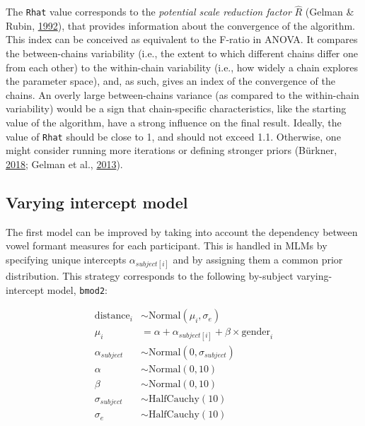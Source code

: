 \documentclass[a4paper,12pt,twoside,openright,oldfontcommands,final]{memoir}
\begin{document}
The \texttt{Rhat} value corresponds to the \emph{potential scale reduction factor} \(\hat{R}\) (Gelman \& Rubin, \protect\hyperlink{ref-gelman_inference_1992}{1992}), that provides information about the convergence of the algorithm. This index can be conceived as equivalent to the F-ratio in ANOVA. It compares the between-chains variability (i.e., the extent to which different chains differ one from each other) to the within-chain variability (i.e., how widely a chain explores the parameter space), and, as such, gives an index of the convergence of the chains. An overly large between-chains variance (as compared to the within-chain variability) would be a sign that chain-specific characteristics, like the starting value of the algorithm, have a strong influence on the final result. Ideally, the value of \texttt{Rhat} should be close to 1, and should not exceed 1.1. Otherwise, one might consider running more iterations or defining stronger priors (Bürkner, \protect\hyperlink{ref-R-brms}{2018}; Gelman et al., \protect\hyperlink{ref-gelman_bayesian_2013}{2013}).

\hypertarget{shrink}{%
\subsection{Varying intercept model}\label{shrink}}

The first model can be improved by taking into account the dependency between vowel formant measures for each participant. This is handled in MLMs by specifying unique intercepts \(\alpha_{subject[i]}\) and by assigning them a common prior distribution. This strategy corresponds to the following by-subject varying-intercept model, \texttt{bmod2}:

\[
\begin{aligned}
\text{distance}_{i} &\sim \mathrm{Normal}(\mu_{i}, \sigma_{e}) \\
\mu_{i} &= \alpha + \alpha_{subject[i]} + \beta \times \text{gender}_{i} \\
\alpha_{subject} &\sim \mathrm{Normal}(0, \sigma_{subject}) \\
\alpha &\sim \mathrm{Normal}(0, 10) \\
\beta &\sim \mathrm{Normal}(0, 10) \\
\sigma_{subject} &\sim \mathrm{HalfCauchy}(10) \\
\sigma_{e} &\sim \mathrm{HalfCauchy}(10) \\
\end{aligned}
\]

\vspace{5mm}
\end{document}
